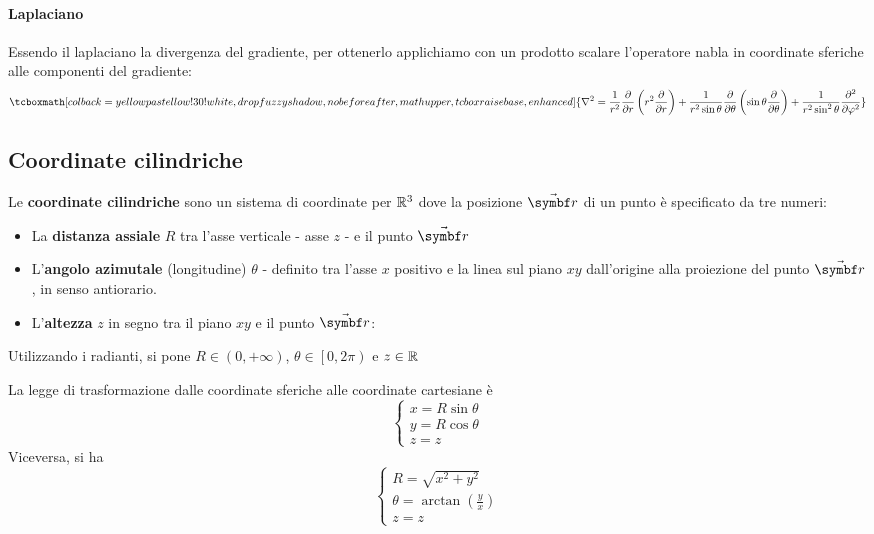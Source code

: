\paragraph{Laplaciano}
Essendo il laplaciano la divergenza del gradiente, per ottenerlo applichiamo con un prodotto scalare l'operatore nabla in coordinate sferiche alle componenti del gradiente:
\begin{equation}
	\tcboxmath[colback=yellowpastellow!30!white,drop fuzzy shadow, nobeforeafter, math upper, tcbox raise base, enhanced]{\laplacian=\frac{1}{r^2}\pdv{r}\left(r^2\pdv{r}\right)+\frac{1}{r^2\sin\theta}\pdv{\theta}\left(\sin\theta\pdv{\theta}\right)+\frac{1}{r^2\sin^2\theta}\pdv[2]{\phi}}
\end{equation}
\subsection{Coordinate cilindriche}
\begin{define}
	Le \textbf{coordinate cilindriche} sono un sistema di coordinate per $\mathbb{R}^3$ dove la posizione $\vba{r}$ di un punto è specificato da tre numeri:
	\begin{itemize}
		\item La \textbf{distanza assiale} $R$ tra l'asse verticale - asse $z$ - e il punto $\vba{r}$
		\item L'\textbf{angolo azimutale} (longitudine) $\theta$ - definito tra l'asse $x$ positivo e la linea sul piano $xy$ dall'origine alla proiezione del punto $\vba{r}$, in senso antiorario.
		\item L'\textbf{altezza} $z$ in segno tra il piano $xy$ e il punto $\vba{r}$:
	\end{itemize}
	Utilizzando i radianti, si pone $R\in\left(0,+\infty\right)$, $\theta\in\left[0,2\pi\right)$ e $z\in\mathbb{R}$
\end{define}
La legge di trasformazione dalle coordinate sferiche alle coordinate cartesiane è
\begin{equation}
	\begin{cases}
		x=R\sin\theta\\
		y=R\cos\theta\\
		z=z
	\end{cases}
\end{equation}
Viceversa, si ha
\begin{equation}
	\begin{cases}
		R=\sqrt{x^2+y^2}\\
		\theta=\arctan\left(\frac{y}{x}\right)\\
		z=z
	\end{cases}	
\end{equation}
